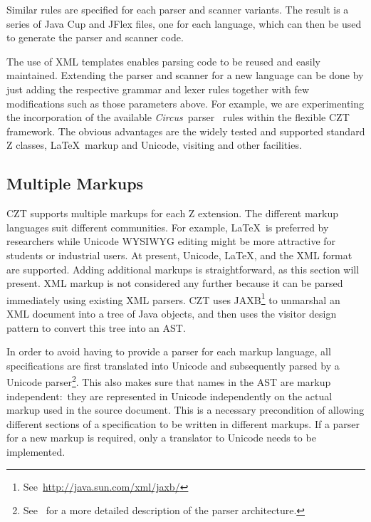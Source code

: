 \documentclass{llncs}
\newcommand{\Circus}{{\sf\slshape Circus}}
\begin{document}
Similar rules are specified for each parser and scanner variants. The
result is a series of Java Cup and JFlex files, one for each language,
which can then be used to generate the parser and scanner code.

The use of XML templates enables parsing code to be reused and easily
maintained.  Extending the parser and scanner for a new language can
be done by just adding the respective grammar and lexer rules together
with few modifications such as those parameters above.  For example,
we are experimenting the incorporation of the available \Circus\
parser~\cite{circus.other:parser} rules within the flexible CZT
framework. The obvious advantages are the widely tested and supported
standard Z classes, \LaTeX\ markup and Unicode, visiting and other
facilities.

\subsection{Multiple Markups}\label{multiple-markups}

 CZT supports multiple markups for each Z extension.  The different
 markup languages suit different communities.  For example, \LaTeX\ is
 preferred by researchers while Unicode WYSIWYG editing might be more
 attractive for students or industrial users. At present, Unicode,
 \LaTeX, and the XML format are supported.  Adding additional markups
 is straightforward, as this section will present.  XML markup is not
 considered any further because it can be parsed immediately using
 existing XML parsers.  CZT uses
 JAXB\footnote{See~\url{http://java.sun.com/xml/jaxb/}} to unmarshal an
 XML document into a tree of Java objects, and then uses the visitor
 design pattern to convert this tree into an AST.

In order to avoid having to provide a parser for each markup language,
all specifications are first translated into Unicode and subsequently
parsed by a Unicode parser\footnote{See~\cite{czt} for a more detailed
description of the parser architecture.}.  This also makes sure that
names in the AST are markup independent:~they are represented in
Unicode independently on the actual markup used in the source
document.  This is a necessary precondition of allowing different
sections of a specification to be written in different markups.  If a
parser for a new markup is required, only a translator to Unicode
needs to be implemented.
\end{document}
